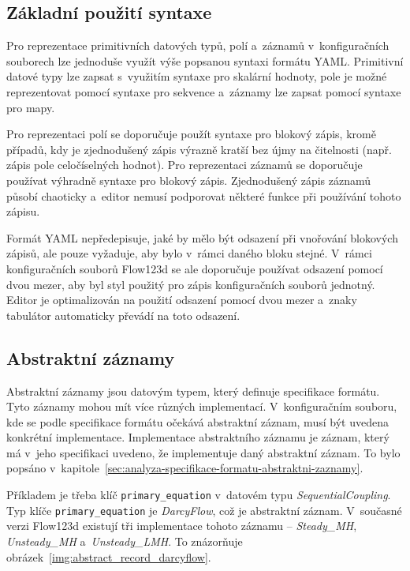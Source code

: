 \documentclass[FM,bw,DP]{tulthesis}
\begin{document}
\subsection{Základní použití syntaxe}

Pro reprezentace primitivních datových typů, polí a~záznamů v~konfiguračních souborech lze jednoduše využít výše popsanou syntaxi formátu \gls{YAML}. Primitivní datové typy lze zapsat s~využitím syntaxe pro skalární hodnoty, pole je možné reprezentovat pomocí syntaxe pro sekvence a~záznamy lze zapsat pomocí syntaxe pro mapy.

Pro reprezentaci polí se doporučuje použít syntaxe pro blokový zápis, kromě případů, kdy je zjednodušený zápis výrazně kratší bez újmy na čitelnosti (např. zápis pole celočíselných hodnot). Pro reprezentaci záznamů se doporučuje používat výhradně syntaxe pro blokový zápis. Zjednodušený zápis záznamů působí chaoticky a~editor nemusí podporovat některé funkce při používání tohoto zápisu.

Formát \gls{YAML} nepředepisuje, jaké by mělo být odsazení při vnořování blokových zápisů, ale pouze vyžaduje, aby bylo v~rámci daného bloku stejné. V~rámci konfiguračních souborů Flow123d se ale doporučuje používat odsazení pomocí dvou mezer, aby byl styl použitý pro zápis konfiguračních souborů jednotný. Editor je optimalizován na použití odsazení pomocí dvou mezer a~znaky tabulátor automaticky převádí na toto odsazení.

\subsection{Abstraktní záznamy}
\label{sec:navrh-yaml-abstrakni-zaznamy}
Abstraktní záznamy jsou datovým typem, který definuje specifikace formátu. Tyto záznamy mohou mít více různých implementací. V~konfiguračním souboru, kde se podle specifikace formátu očekává abstraktní záznam, musí být uvedena konkrétní implementace. Implementace abstraktního záznamu je záznam, který má v~jeho specifikaci uvedeno, že implementuje daný abstraktní záznam. To bylo popsáno v~kapitole~\ref{sec:analyza-specifikace-formatu-abstraktni-zaznamy}.

Příkladem je třeba klíč \texttt{primary\_equation} v~datovém typu \textit{SequentialCoupling}. Typ klíče \texttt{primary\_equation} je \textit{DarcyFlow}, což je abstraktní záznam. V~současné verzi Flow123d existují tři implementace tohoto záznamu -- \textit{Steady\_MH}, \textit{Unsteady\_MH} a~\textit{Unsteady\_LMH}. To znázorňuje obrázek~\ref{img:abstract_record_darcyflow}.
\end{document}
